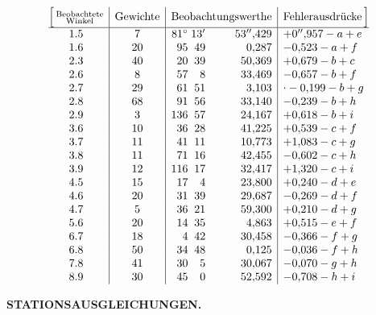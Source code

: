 \[
\begin{array}{@{}c|c|r@{\;}r@{\;}r|l@{}}
 \Bigl[\,\substack{\text{Beobachtete}\\\text{Winkel}}&
 \text{Gewichte}&\multicolumn{3}{c|}{\text{Beobachtungswerthe}}&
 \multicolumn{1}{c@{}}{\text{Fehlerausdrücke}\,\Bigr]}\\
 \hline
 1.5&7&81^\circ&13'&53''{,}429&+0''{,}957-a+e\\
 1.6&20&95&49&0{,}287&-0{,}523-a+f\\
 2.3&40&20&39&50{,}369&+0{,}679-b+c\\
 2.6&8&57&8&33{,}469&-0{,}657-b+f\\
 2.7&29&61&51&3{,}103&\mathord{\raisebox{.55ex}{.}}-0{,}199-b+g\\
 2.8&68&91&56&33{,}140&-0{,}239-b+h\\
 2.9&3&136&57&24{,}167&+0{,}618-b+i\\
 3.6&10&36&28&41{,}225&+0{,}539-c+f\\
 3.7&11&41&11&10{,}773&+1{,}083-c+g\\
 3.8&11&71&16&42{,}455&-0{,}602-c+h\\
 3.9&12&116&17&32{,}417&+1{,}320-c+i\\
 4.5&15&17&4&23{,}800&+0{,}240-d+e\\
 4.6&20&31&39&29{,}687&-0{,}269-d+f\\
 4.7&5&36&21&59{,}300&+0{,}210-d+g\\
 5.6&20&14&35&4{,}863&+0{,}515-e+f\\
 6.7&18&4&42&30{,}458&-0{,}366-f+g\\
 6.8&50&34&48&0{,}125&-0{,}036-f+h\\
 7.8&41&30&5&30{,}067&-0{,}070-g+h\\
 8.9&30&45&0&52{,}592&-0{,}708-h+i
\end{array}
\]

\par\clearpage
\noindent\null\hfill{\small\textbf{STATIONSAUSGLEICHUNGEN.}}\hfill{}\par\medskip

